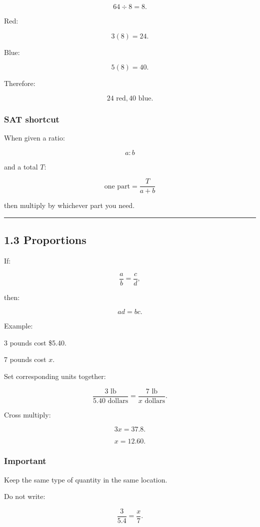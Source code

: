 \documentclass[
]{article}
\begin{document}
\[
64\div8=8.
\]

Red:

\[
3(8)=24.
\]

Blue:

\[
5(8)=40.
\]

Therefore:

\[
\boxed{24\text{ red},40\text{ blue}}.
\]

\subsubsection{SAT shortcut}\label{sat-shortcut}

When given a ratio:

\[
a:b
\]

and a total \(T\):

\[
\boxed{\text{one part}=\frac{T}{a+b}}
\]

then multiply by whichever part you need.

\begin{center}\rule{0.5\linewidth}{0.5pt}\end{center}

\subsection{1.3 Proportions}\label{proportions}

If:

\[
\frac ab=\frac cd,
\]

then:

\[
\boxed{ad=bc}.
\]

Example:

3 pounds cost \$5.40.

7 pounds cost \(x\).

Set corresponding units together:

\[
\frac{3\text{ lb}}{5.40\text{ dollars}}
=
\frac{7\text{ lb}}{x\text{ dollars}}.
\]

Cross multiply:

\[
3x=37.8.
\]

\[
\boxed{x=12.60}.
\]

\subsubsection{Important}\label{important}

Keep the same type of quantity in the same location.

Do not write:

\[
\frac{3}{5.4}=\frac{x}{7}.
\]
\end{document}
